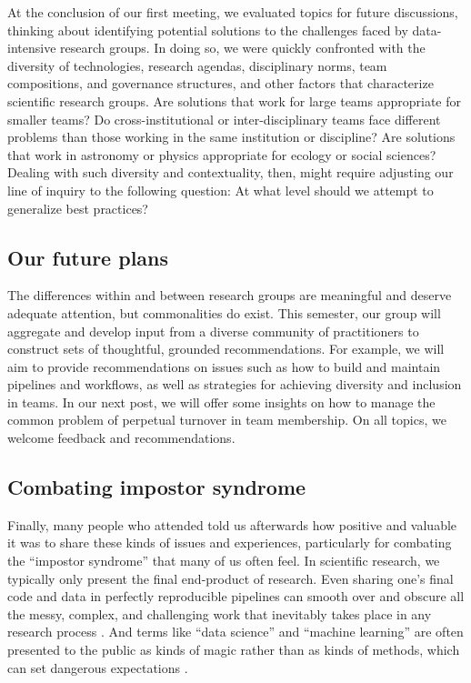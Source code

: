 \documentclass[11pt]{elife}
\begin{document}
At the conclusion of our first meeting, we evaluated topics for future discussions, thinking about identifying potential solutions to the challenges faced by data-intensive research groups. In doing so, we were quickly confronted with the diversity of technologies, research agendas, disciplinary norms, team compositions, and governance structures, and other factors that characterize scientific research groups. Are solutions that work for large teams appropriate for smaller teams? Do cross-institutional or inter-disciplinary teams face different problems than those working in the same institution or discipline? Are solutions that work in astronomy or physics appropriate for ecology or social sciences? Dealing with such diversity and contextuality, then, might require adjusting our line of inquiry to the following question: At what level should we attempt to generalize best practices?  

\subsection{Our future plans}
 
The differences within and between research groups are meaningful and deserve adequate attention, but commonalities do exist. This semester, our group will aggregate and develop input from a diverse community of practitioners to construct sets of thoughtful, grounded recommendations. For example, we will aim to provide recommendations on issues such as how to build and maintain pipelines and workflows, as well as strategies for achieving diversity and inclusion in teams. In our next post, we will offer some insights on how to manage the common problem of perpetual turnover in team membership. On all topics, we welcome feedback and recommendations.

\subsection{Combating impostor syndrome}

Finally, many people who attended told us afterwards how positive and valuable it was to share these kinds of issues and experiences, particularly for combating the “impostor syndrome” that many of us often feel. In scientific research, we typically only present the final end-product of research. Even sharing one’s final code and data in perfectly reproducible pipelines can smooth over and obscure all the messy, complex, and challenging work that inevitably takes place in any research process \citep{neff2017critique}. And terms like ``data science'' and ``machine learning'' are often presented to the public as kinds of magic rather than as kinds of methods, which can set dangerous expectations \citep{elish2018}.
\end{document}
